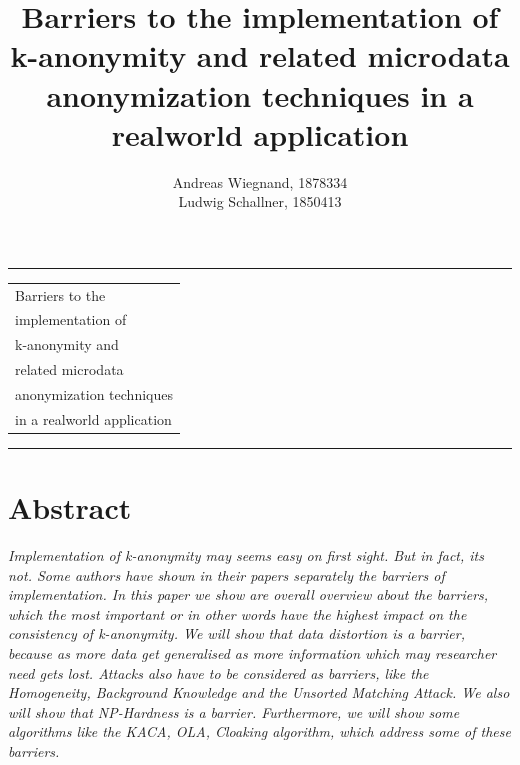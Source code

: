 \documentclass{llncs}
\begin{document}
\thispagestyle{empty}
\rule{\textwidth}{1pt}
\vspace{2pt}
\begin{flushright}
\Huge
\begin{tabular}{@{}l}
Barriers to the\\
implementation of\\
k-anonymity and\\
related microdata\\
anonymization techniques\\
in a realworld application\\[6pt]

\end{tabular}
\end{flushright}
\rule{\textwidth}{1pt}
\vfill
\title{Barriers to the implementation of k-anonymity and related microdata anonymization techniques in a realworld application}
\author{Andreas Wiegnand, 1878334\\
	Ludwig Schallner, 1850413}
\institute{}
\maketitle
%
\section*{Abstract}
\textit{Implementation of k-anonymity may seems easy on first sight. But in fact, its not. Some authors have shown in their papers separately the barriers of implementation. In this paper we show are overall overview about the barriers, which the most important or in other words have the highest impact on the consistency of k-anonymity. We will show that data distortion is a barrier, because as more data get generalised as more information which may researcher need gets lost. Attacks also have to be considered as barriers, like the Homogeneity, Background Knowledge and the Unsorted Matching Attack. We also will show that NP-Hardness is a barrier. Furthermore, we will show some algorithms like the KACA, OLA, Cloaking algorithm, which address some of these barriers.}
\newpage
\setcounter{page}{1}
\end{document}
